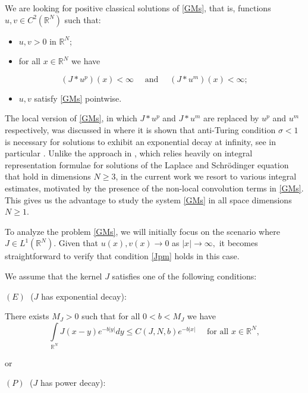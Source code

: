 \documentclass[leqno,12pt]{article}
\newcommand{\intl}{\int\limits}
\newcommand{\R}{\mathbb R}
\numberwithin{equation}{section}
\begin{document}
We are looking for positive classical solutions of \eqref{GMs}, that is, functions $u, v\in C^2(\R^N)$ such that:
\begin{itemize}
\item $u, v>0$ in $\R^N$; 
\item for all $x\in \R^N$ we have
\end{itemize}
\begin{equation}\label{Jpm}
(J*u^p)(x)<\infty \quad\mbox{ and }\quad (J*u^m)(x)<\infty;
\end{equation}
\begin{itemize}
\item $u, v$ satisfy \eqref{GMs} pointwise.
\end{itemize}



The local version of \eqref{GMs}, in which $J*u^p$ and $J*u^m$ are replaced by $u^p$ and $u^m$ respectively, was discussed in \cite{G23} where it is shown that anti-Turing condition $\sigma<1$ is necessary for solutions to exhibit an exponential decay at infinity, see in particular \cite[Theorem 1.1]{G23}. Unlike the approach in \cite{G23}, which relies heavily on integral representation formulae for solutions of the Laplace and Schr\"odinger equation that hold in dimensions $N\geq 3$,  in the current work we resort to various integral estimates, motivated by the presence of the non-local convolution terms in \eqref{GMs}. This gives us the advantage to study the system \eqref{GMs} in all space dimensions $N\geq 1$. 

To analyze the problem \eqref{GMs}, we will initially focus on the scenario where  $J\in L^1(\R^N)$. Given that $u(x), v(x)\to 0$ as $|x|\to \infty,$   it becomes straightforward to verify that condition \eqref{Jpm} holds in this case.


\newpage

We assume that the kernel $J$ satisfies one of the following conditions:

\noindent $(E)\;$ ($J$ has exponential decay):
\smallskip

There exists $M_J>0$ such that for all $0<b<M_J$ we have 
\begin{equation}\label{E}
\intl_{\R^N}J(x-y)e^{-b|y|}dy\leq C(J,N,b) e^{-b|x|}\quad\mbox{ for all }x\in \R^N,
\end{equation}
\medskip

or

\medskip

\noindent $(P)\;$ ($J$ has power decay): 
\smallskip
\end{document}
